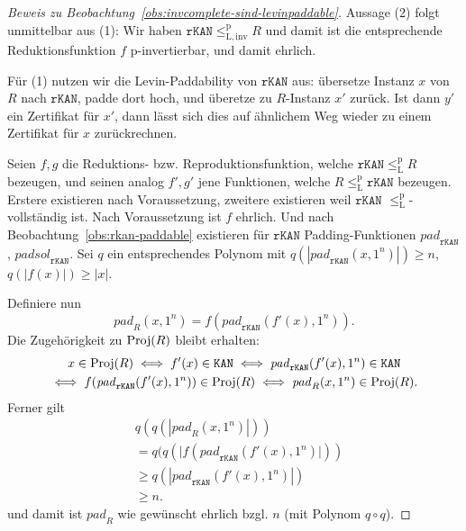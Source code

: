 \begin{proof}[Beweis zu Beobachtung~\ref{obs:invcomplete-sind-levinpaddable}]
    Aussage (2) folgt unmittelbar aus (1): Wir haben $\mathtt{rKAN}\leq_\mathrm{L,inv}^\mathrm{p} R$ und damit ist die entsprechende Reduktionsfunktion $f$ p-invertierbar, und damit ehrlich.

    Für (1) nutzen wir die Levin-Paddability von $\mathtt{rKAN}$ aus: übersetze Instanz $x$ von $R$ nach $\mathtt{rKAN}$, padde dort hoch, und überetze zu $R$-Instanz $x'$ zurück. Ist dann $y'$ ein Zertifikat für $x'$, dann lässt sich dies auf ähnlichem Weg wieder zu einem Zertifikat für $x$ zurückrechnen.

    Seien $f, g$ die Reduktions- bzw. Reproduktionsfunktion, welche $\mathtt{rKAN}\leq_\mathrm{L}^\mathrm p R$ bezeugen, und seinen analog $f', g'$ jene Funktionen, welche $R\leq_\mathrm{L}^\mathrm p \mathtt{rKAN}$ bezeugen. Erstere existieren nach Voraussetzung, zweitere existieren weil $\mathtt{rKAN}$ $\leq_\mathrm{L}^\mathrm p$-vollständig ist.
    Nach Voraussetzung ist $f$ ehrlich. %
    Und nach Beobachtung~\ref{obs:rkan-paddable} existieren für $\mathtt{rKAN}$ Padding-Funktionen $\mathit{pad}_\mathtt{rKAN}$, $\mathit{padsol}_\mathtt{rKAN}$.
    Sei $q$ ein entsprechendes Polynom mit $q(|\mathit{pad}_\mathtt{rKAN}(x, 1^n)|)\geq n$, $q(|f(x)|) \geq |x|$.

    Definiere nun
    \[ \mathit{pad}_R(x, 1^n) = f(\mathit{pad}_\mathtt{rKAN}(f'(x), 1^n)). \]
    Die Zugehörigkeit zu $\operatorname{Proj}(R)$ bleibt erhalten:
    \begin{multline*}
        x\in \operatorname{Proj}(R) \iff f'(x) \in \mathtt{KAN} \iff \mathit{pad}_\mathtt{rKAN}(f'(x), 1^n) \in \mathtt{KAN}\\ \iff f(\mathit{pad}_\mathtt{rKAN}(f'(x), 1^n)) \in \operatorname{Proj}(R) \iff \mathit{pad}_R(x, 1^n) \in\operatorname{Proj}(R).
    \end{multline*}
    Ferner gilt
    \begin{align*} &q(q(|\mathit{pad}_R(x, 1^n)|)) \\&= q(q(|f(\mathit{pad}_\mathtt{rKAN}(f'(x), 1^n)|))\\&\geq q(|\mathit{pad}_\mathtt{rKAN}(f'(x), 1^n)|)\\ &\geq n.
    \end{align*}
    und damit ist $\mathit{pad}_R$ wie gewünscht ehrlich bzgl. $n$ (mit Polynom $q\circ q$).


\end{proof}
